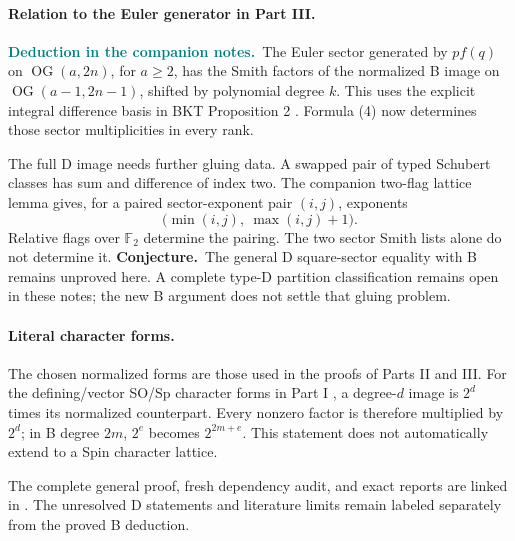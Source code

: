 \documentclass[11pt,letterpaper]{article}
\newcommand{\F}{\mathbb F}
\newcommand{\OG}{\operatorname{OG}}
\newcommand{\deduction}{\textcolor{teal}{\textbf{Deduction in the companion notes.}}\ }
\newcommand{\conjectural}{\textcolor{wine}{\textbf{Conjecture.}}\ }
\begin{document}
\paragraph{Relation to the Euler generator in Part III.}
\deduction The Euler sector generated by \(p f(q)\) on
\(\OG(a,2n)\), for \(a\ge2\), has the Smith factors of the normalized B
image on \(\OG(a-1,2n-1)\), shifted by polynomial degree \(k\).
This uses the explicit integral difference basis in BKT
Proposition 2 \cite{BKTD}. Formula (4) now determines those sector
multiplicities in every rank.

The full D image needs further gluing data. A swapped pair of typed
Schubert classes has sum and difference of index two.
The companion two-flag lattice lemma gives, for a paired
sector-exponent pair \((i,j)\), exponents
\[
 \bigl(\min(i,j),\ \max(i,j)+1\bigr).
 \tag{19}
\]
Relative flags over \(\F_2\) determine the pairing.
The two sector Smith lists alone do not determine it.
\conjectural The general D square-sector equality with B remains
unproved here. A complete type-D partition classification remains open
in these notes; the new B argument does not settle that gluing problem.

\paragraph{Literal character forms.}
The chosen normalized forms are those used in the proofs of Parts II
and III. For the defining/vector SO/Sp character forms in Part I
\cite{K}, a degree-\(d\) image is \(2^d\) times its normalized
counterpart. Every nonzero factor is therefore multiplied by \(2^d\);
in B degree \(2m\), \(2^e\) becomes \(2^{2m+e}\).
This statement does not automatically extend to a Spin character lattice.

The complete general proof, fresh dependency audit, and exact reports
are linked in \cite{Repo}. The unresolved D statements and literature
limits remain labeled separately from the proved B deduction.
\end{document}
